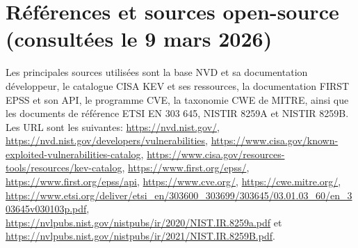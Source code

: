 \documentclass[12pt]{article}
\begin{document}
\newpage
\section*{Références et sources open-source (consultées le 9 mars 2026)}

Les principales sources utilisées sont la base NVD et sa documentation développeur, le catalogue CISA KEV et ses ressources, la documentation FIRST EPSS et son API, le programme CVE, la taxonomie CWE de MITRE, ainsi que les documents de référence ETSI EN 303 645, NISTIR 8259A et NISTIR 8259B. Les URL sont les suivantes: \url{https://nvd.nist.gov/}, \url{https://nvd.nist.gov/developers/vulnerabilities}, \url{https://www.cisa.gov/known-exploited-vulnerabilities-catalog}, \url{https://www.cisa.gov/resources-tools/resources/kev-catalog}, \url{https://www.first.org/epss/}, \url{https://www.first.org/epss/api}, \url{https://www.cve.org/}, \url{https://cwe.mitre.org/}, \url{https://www.etsi.org/deliver/etsi_en/303600_303699/303645/03.01.03_60/en_303645v030103p.pdf}, \url{https://nvlpubs.nist.gov/nistpubs/ir/2020/NIST.IR.8259a.pdf} et \url{https://nvlpubs.nist.gov/nistpubs/ir/2021/NIST.IR.8259B.pdf}.
\end{document}
